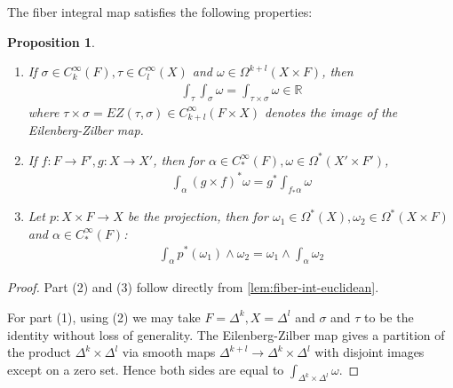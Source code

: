 \documentclass{scrartcl}
\theoremstyle{plain}
\newtheorem{proposition}[theorem]{Proposition}
\theoremstyle{definition}
\newcommand{\R}{\mathbb R}
\begin{document}
The fiber integral map satisfies the following properties:
\begin{proposition}
    \begin{enumerate}
        \item If $\sigma\in C^\infty_k(F), \tau\in C^\infty_l(X)$ and $\omega\in\Omega^{k+l}(X\times F)$, then
        \begin{align*}
            \int_\tau\int_\sigma\omega = \int_{\tau\times\sigma}\omega \in \R
        \end{align*}
        where $\tau\times\sigma = EZ(\tau,\sigma)\in C^\infty_{k+l}(F\times X)$ denotes the image of the Eilenberg-Zilber map. 
        \item If $f\colon F\to F', g\colon X\to X'$, then for $\alpha\in C^\infty_*(F), \omega\in \Omega^*(X'\times F')$,
        \begin{align*}
            \int_\alpha (g\times f)^*\omega = g^*\int_{f_*\alpha}\omega
        \end{align*}
        \item Let $p\colon X\times F\to X$ be the projection, then for $\omega_1\in\Omega^*(X), \omega_2\in\Omega^*(X\times F)$ and $\alpha\in C^\infty_*(F)$:
        \begin{align*}
            \int_{\alpha} p^*(\omega_1)\wedge\omega_2 = \omega_1\wedge\int_{\alpha}\omega_2
        \end{align*}
\end{enumerate}
\end{proposition}
\begin{proof}
    Part (2) and (3) follow directly from \cref{lem:fiber-int-euclidean}. 

    For part (1), using (2) we may take $F=\Delta^k, X=\Delta^l$ and $\sigma$ and $\tau$ to be the identity without loss of generality. The Eilenberg-Zilber map gives a partition of the product $\Delta^{k}\times\Delta^l$ via smooth maps $\Delta^{k+l}\to\Delta^k\times\Delta^l$ with disjoint images except on a zero set. Hence both sides are equal to $\int_{\Delta^k\times\Delta^l} \omega$. 
\end{proof}
\end{document}
